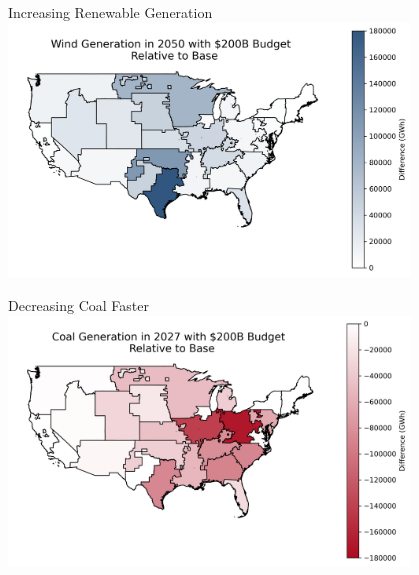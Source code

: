 \documentclass{beamer}
\begin{document}
\begin{frame}{Increasing Renewable Generation}
    \centering
    \includegraphics[width=0.8\textwidth]{Figures/EndogenousPaper/wind_generation_map.png}
\end{frame}

\begin{frame}{Decreasing Coal Faster}
    \centering
    \includegraphics[width=0.8\textwidth]{Figures/EndogenousPaper/coal_generation_map_2027_200B.png}
\end{frame}
\end{document}
